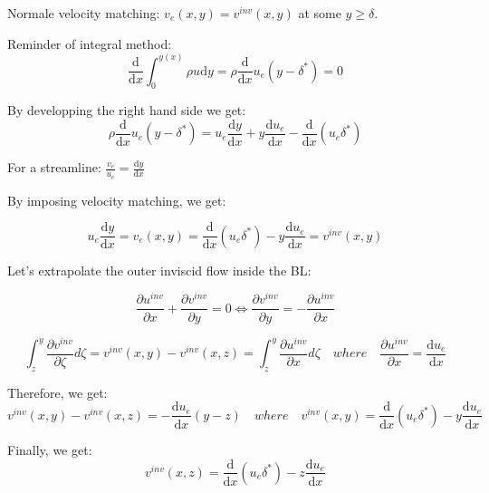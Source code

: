 Normale velocity matching: $ v_e(x,y)=v^{inv}(x,y)$ at some $y \ge \delta$. 

Reminder of integral method:
\begin{equation}
\newcommand{\deriv}{\mathrm{d}}
\frac{\deriv}{\deriv x} \int_0^{y(x)} \rho u \deriv y =\rho \frac{\deriv}{\deriv x} u_e (y-\delta^*)=0
\end{equation}

By developping the right hand side we get:
\begin{equation}
\newcommand{\deriv}{\mathrm{d}}
\rho \frac{\deriv}{\deriv x} u_e (y-\delta^*)=u_e \frac{\deriv y}{\deriv x} +y  \frac{\deriv u_e}{\deriv x} - \frac{\deriv}{\deriv x} (u_e\delta^*)
\end{equation}

For a streamline: $ \newcommand{\deriv}{\mathrm{d}} \frac{v_e}{u_e}=\frac{\deriv y}{\deriv x}$

By imposing velocity matching, we get:

\begin{equation}
\newcommand{\deriv}{\mathrm{d}}
u_e\frac{\deriv y}{\deriv x}=v_e(x,y)=\frac{\deriv}{\deriv x} (u_e\delta^*)-y\frac{\deriv u_e}{\deriv x}=v^{inv}(x,y)
\end{equation}

Let's extrapolate the outer inviscid flow inside the BL:

\begin{equation}
\newcommand{\deriv}{\mathrm{d}}
\frac{\partial u^{inv}}{\partial x}+\frac{\partial v^{inv}}{\partial y}=0 \Leftrightarrow \frac{\partial v^{inv}}{\partial y}=-\frac{\partial u^{inv}}{\partial x} 
\end{equation}

\begin{equation}
\newcommand{\deriv}{\mathrm{d}}
\int_z^y \frac{\partial v^{inv}}{\partial \zeta} d\zeta=v^{inv}(x,y)-v^{inv}(x,z)=\int_z^y \frac{\partial u^{inv}}{\partial x} d\zeta \quad where \quad \frac{\partial u^{inv}}{\partial x}=\frac{\deriv u_e}{\deriv x}
\end{equation}

Therefore, we get:
\begin{equation}
\newcommand{\deriv}{\mathrm{d}}
v^{inv}(x,y)-v^{inv}(x,z)=-\frac{\deriv u_e}{\deriv x} (y-z) \quad where \quad v^{inv}(x,y)=\frac{\deriv}{\deriv x} (u_e\delta^*)-y\frac{\deriv u_e}{\deriv x}
\end{equation}

Finally, we get:
\begin{equation}
\newcommand{\deriv}{\mathrm{d}}
v^{inv}(x,z)=\frac{\deriv}{\deriv x} (u_e\delta^*)-z\frac{\deriv u_e}{\deriv x}
\end{equation}

